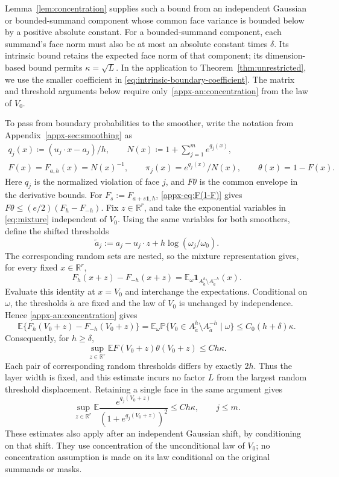 \documentclass[11pt,letterpaper]{article}
\theoremstyle{remark}
\newcommand{\E}{\mathbb E}
\newcommand{\Pp}{\mathbb P}
\newcommand{\R}{\mathbb R}
\newcommand{\ind}{\mathbf 1}
\begin{document}
Lemma~\ref{lem:concentration} supplies such a bound from an independent
Gaussian or bounded-summand component whose common face variance is
bounded below by a positive absolute constant. For a bounded-summand
component, each summand's face norm must also be at most an absolute
constant times \(\delta\). Its intrinsic bound retains the expected
face norm of that component; its dimension-based bound permits
\(\kappa=\sqrt L\). In the application to
Theorem~\ref{thm:unrestricted}, we use the smaller coefficient in
\eqref{eq:intrinsic-boundary-coefficient}. The matrix and threshold
arguments below require only~\eqref{appx-an:concentration} from the
law of \(V_0\).

To pass from boundary probabilities to the smoother, write the
notation from Appendix~\ref{appx-sec:smoothing} as
\begin{equation}
 \label{appx-an:basic-notation}
 \begin{gathered}
 q_j(x)\coloneqq(u_j\cdot x-a_j)/h,\qquad
 N(x)\coloneqq1+\sum_{j=1}^m e^{q_j(x)},\\
 F(x)=F_{a,h}(x)=N(x)^{-1},\qquad
 \pi_j(x)=e^{q_j(x)}/N(x),\qquad \theta(x)=1-F(x).
 \end{gathered}
\end{equation}
Here \(q_j\) is the normalized violation of face \(j\), and
\(F\theta\) is the common envelope in the derivative bounds.
For \(F_s:=F_{a+s\mathbf1,h}\),
\eqref{appx-eq:F(1-F)} gives
\(F\theta\le(e/2)(F_h-F_{-h})\).
Fix $z\in\R^r$, and take the exponential variables in
\eqref{eq:mixture} independent of $V_0$. Using the same variables
for both smoothers, define the shifted thresholds
\[
 \widetilde a_j
 :=a_j-u_j\cdot z+h\log(\omega_j/\omega_0).
\]
The corresponding random sets are nested, so the mixture
representation gives, for every fixed $x\in\R^r$,
\[
 F_h(x+z)-F_{-h}(x+z)
 =\E_\omega\ind_{A_{\widetilde a}^{h}
                    \setminus A_{\widetilde a}^{-h}}(x).
\]
Evaluate this identity at $x=V_0$ and interchange the expectations.
Conditional on $\omega$, the thresholds $\widetilde a$ are fixed
and the law of $V_0$ is unchanged by independence. Hence
\eqref{appx-an:concentration} gives
\[
 \E\{F_h(V_0+z)-F_{-h}(V_0+z)\}
 =\E_\omega\Pp\{V_0\in
       A_{\widetilde a}^{h}\setminus A_{\widetilde a}^{-h}
       \mid\omega\}
 \le C_0(h+\delta)\kappa.
\]
Consequently, for \(h\ge\delta\),
\begin{equation}
 \sup_{z\in\R^r}\E F(V_0+z)\theta(V_0+z)\le Ch\kappa.
 \label{appx-an:weight-concentration}
\end{equation}
Each pair of corresponding random thresholds differs by exactly
$2h$. Thus the layer width is fixed, and this estimate incurs no
factor $L$ from the largest random threshold displacement.
Retaining a single face in the same argument gives
\[
 \sup_{z\in\R^r}\E
 \frac{e^{q_j(V_0+z)}}{(1+e^{q_j(V_0+z)})^2}
 \le Ch\kappa,\qquad j\le m.
\]
These estimates also apply after an independent Gaussian shift,
by conditioning on that shift. They use concentration of the
unconditional law of \(V_0\); no concentration assumption is made
on its law conditional on the original summands or masks.
\end{document}
